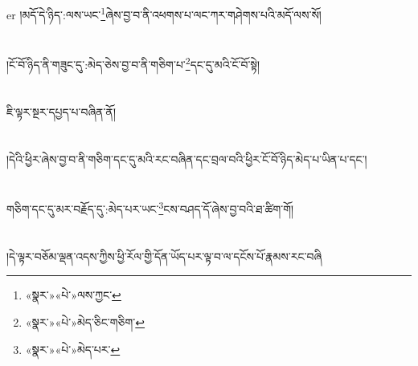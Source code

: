 er{ }།མདོ་དེ་ཉིད་:ལས་ཡང་\footnote{«སྣར་»«པེ་»ལས་ཀྱང་}ཞེས་བྱ་བ་ནི་འཕགས་པ་ལང་ཀར་གཤེགས་པའི་མདོ་ལས་སོ།\chapter{ }།ངོ་བོ་ཉིད་ནི་གཟུང་དུ་:མེད་ཅེས་བྱ་བ་ནི་གཅིག་པ་\footnote{«སྣར་»«པེ་»མེད་ཅིང་གཅིག་}དང་དུ་མའི་ངོ་བོ་སྟེ།\chapter{ }ཇི་ལྟར་སྔར་དཔྱད་པ་བཞིན་ནོ།\chapter{ }།དེའི་ཕྱིར་ཞེས་བྱ་བ་ནི་གཅིག་དང་དུ་མའི་རང་བཞིན་དང་བྲལ་བའི་ཕྱིར་ངོ་བོ་ཉིད་མེད་པ་ཡིན་པ་དང་།\chapter{ }གཅིག་དང་དུ་མར་བརྗོད་དུ་:མེད་པར་ཡང་\footnote{«སྣར་»«པེ་»མེད་པར་}ངས་བཤད་དོ་ཞེས་བྱ་བའི་ཐ་ཚིག་གོ།\chapter{ }།དེ་ལྟར་བཅོམ་ལྡན་འདས་ཀྱིས་ཕྱི་རོལ་གྱི་དོན་ཡོད་པར་ལྟ་བ་ལ་དངོས་པོ་རྣམས་རང་བཞི